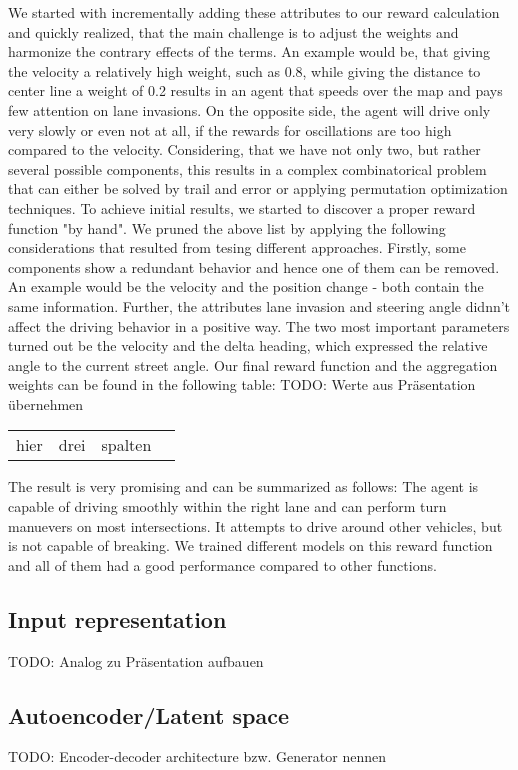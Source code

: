 \documentclass[letterpaper, 10 pt, conference]{ieeeconf}  %
\begin{document}
We started with incrementally adding these attributes to our reward calculation and quickly realized, that the main challenge is to adjust the weights and harmonize the contrary effects of the terms.
An example would be, that giving the velocity a relatively high weight, such as 0.8, while giving the distance to center line a weight of 0.2 results in an agent that speeds over the map and pays few attention on lane invasions. On the opposite side, the agent will drive only very slowly or even not at all, if the rewards for oscillations are too high compared to the velocity. Considering, that we have not only two, but rather several possible components, this results in a complex combinatorical problem that can either be solved by trail and error or applying permutation optimization techniques. To achieve initial results, we started to discover a proper reward function "by hand". 
\newline
We pruned the above list by applying the following considerations that resulted from tesing different approaches. Firstly, some components show a redundant behavior and hence one of them can be removed. An example would be the velocity and the position change - both contain the same information. Further, the attributes lane invasion and steering angle didnn't affect the driving behavior in a positive way. The two most important parameters turned out be the velocity and the delta heading, which expressed the relative angle to the current street angle. Our final reward function and the aggregation weights can be found in the following table:
\newline
TODO: Werte aus Präsentation übernehmen
\begin{tabular}{ | l | l | l | p{5cm} |}
	\hline
	hier & drei & spalten
\end{tabular}
\newline

The result is very promising and can be summarized as follows: The agent is capable of driving smoothly within the right lane and can perform turn manuevers on most intersections. It attempts to drive around other vehicles, but is not capable of breaking. We trained different models on this reward function and all of them had a good performance compared to other functions.


\subsection{Input representation}
TODO: Analog zu Präsentation aufbauen
\subsection{Autoencoder/Latent space}
TODO: Encoder-decoder architecture bzw. Generator nennen
\end{document}
